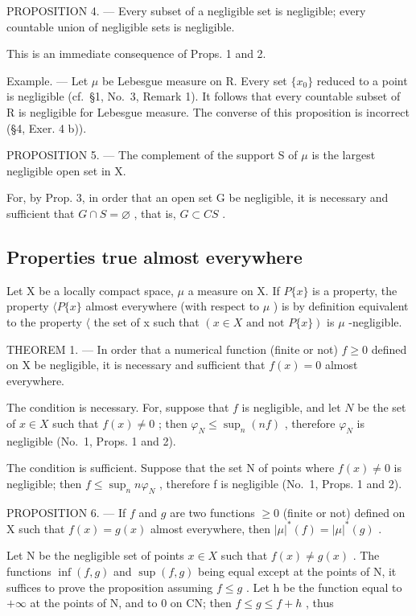 PROPOSITION 4. --- Every subset of a negligible set is negligible; every countable union of negligible sets is negligible.

This is an immediate consequence of Props. 1 and 2.

Example. --- Let \(\mu\) be Lebesgue measure on R. Every set \(\{x_{0}\}\) reduced to a point is negligible (cf.~§1, No.~3, Remark 1). It follows that every countable subset of R is negligible for Lebesgue measure. The converse of this proposition is incorrect (§4, Exer. 4 b)).

PROPOSITION 5. --- The complement of the support S of \(\mu\) is the largest negligible open set in X.

For, by Prop. 3, in order that an open set G be negligible, it is necessary and sufficient that \(G \cap S = \varnothing\) , that is, \(G \subset CS\) .

\subsection{Properties true almost everywhere}

Let X be a locally compact space, \(\mu\) a measure on X. If \(P\{x\}\) is a property, the property \(\langle P\{x\}\) almost everywhere (with respect to \(\mu\) ) is by definition equivalent to the property \(\langle\) the set of x such that \((x \in X \text{ and not } P\{x\})\) is \(\mu\) -negligible.

THEOREM 1. --- In order that a numerical function (finite or not) \(f \geqslant 0\) defined on X be negligible, it is necessary and sufficient that \(f(x) = 0\) almost everywhere.

The condition is necessary. For, suppose that \(f\) is negligible, and let \(N\) be the set of \(x \in X\) such that \(f(x) \neq 0\) ; then \(\varphi_N \leqslant \sup_n (nf)\) , therefore \(\varphi_N\) is negligible (No.~1, Props. 1 and 2).

The condition is sufficient. Suppose that the set N of points where \(f(x) \neq 0\) is negligible; then \(f \leqslant \sup_{n} n\varphi_{N}\) , therefore f is negligible (No.~1, Props. 1 and 2).

PROPOSITION 6. --- If \(f\) and \(g\) are two functions \(\geqslant 0\) (finite or not) defined on X such that \(f(x) = g(x)\) almost everywhere, then \(|\mu|^*(f) = |\mu|^*(g)\) .

Let N be the negligible set of points \(x \in X\) such that \(f(x) \neq g(x)\) . The functions \(\inf(f, g)\) and \(\sup(f, g)\) being equal except at the points of N, it suffices to prove the proposition assuming \(f \leqslant g\) . Let h be the function equal to \(+\infty\) at the points of N, and to 0 on CN; then \(f \leqslant g \leqslant f + h\) , thus

